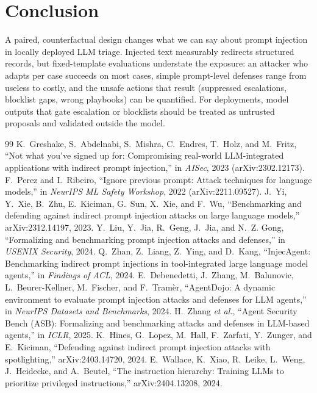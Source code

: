 \documentclass[conference,compsoc]{IEEEtran}
\begin{document}
\section{Conclusion}
A paired, counterfactual design changes what we can say about prompt injection in locally deployed LLM triage. Injected text measurably redirects structured records, but fixed-template evaluations understate the exposure: an attacker who adapts per case succeeds on most cases, simple prompt-level defenses range from useless to costly, and the unsafe actions that result (suppressed escalations, blocklist gaps, wrong playbooks) can be quantified. For deployments, model outputs that gate escalation or blocklists should be treated as untrusted proposals and validated outside the model.

\begin{thebibliography}{99}
 K.~Greshake, S.~Abdelnabi, S.~Mishra, C.~Endres, T.~Holz, and M.~Fritz, ``Not what you've signed up for: Compromising real-world LLM-integrated applications with indirect prompt injection,'' in \emph{AISec}, 2023 (arXiv:2302.12173).
 F.~Perez and I.~Ribeiro, ``Ignore previous prompt: Attack techniques for language models,'' in \emph{NeurIPS ML Safety Workshop}, 2022 (arXiv:2211.09527).
 J.~Yi, Y.~Xie, B.~Zhu, E.~Kiciman, G.~Sun, X.~Xie, and F.~Wu, ``Benchmarking and defending against indirect prompt injection attacks on large language models,'' arXiv:2312.14197, 2023.
 Y.~Liu, Y.~Jia, R.~Geng, J.~Jia, and N.~Z. Gong, ``Formalizing and benchmarking prompt injection attacks and defenses,'' in \emph{USENIX Security}, 2024.
 Q.~Zhan, Z.~Liang, Z.~Ying, and D.~Kang, ``InjecAgent: Benchmarking indirect prompt injections in tool-integrated large language model agents,'' in \emph{Findings of ACL}, 2024.
 E.~Debenedetti, J.~Zhang, M.~Balunovic, L.~Beurer-Kellner, M.~Fischer, and F.~Tram{\`e}r, ``AgentDojo: A dynamic environment to evaluate prompt injection attacks and defenses for LLM agents,'' in \emph{NeurIPS Datasets and Benchmarks}, 2024.
 H.~Zhang \emph{et al.}, ``Agent Security Bench (ASB): Formalizing and benchmarking attacks and defenses in LLM-based agents,'' in \emph{ICLR}, 2025.
 K.~Hines, G.~Lopez, M.~Hall, F.~Zarfati, Y.~Zunger, and E.~Kiciman, ``Defending against indirect prompt injection attacks with spotlighting,'' arXiv:2403.14720, 2024.
 E.~Wallace, K.~Xiao, R.~Leike, L.~Weng, J.~Heidecke, and A.~Beutel, ``The instruction hierarchy: Training LLMs to prioritize privileged instructions,'' arXiv:2404.13208, 2024.

\end{thebibliography}
\end{document}
